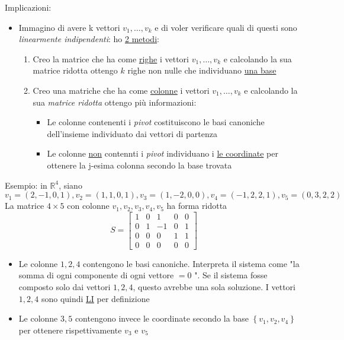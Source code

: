 \documentclass[12pt,a4paper,oneside]{article}
\begin{document}
Implicazioni:
\begin{itemize}
	\item Immagino di avere k vettori $v_1,\ldots,v_k$ e di voler verificare quali di questi sono \textit{linearmente indipendenti}: ho \underline{2 metodi}:
	      \begin{enumerate}
		      \item Creo la matrice che ha come \underline{righe} i vettori $v_1,\ldots,v_k$ e calcolando la sua matrice ridotta ottengo $k$ righe non nulle che individuano \underline{una base}
		      \item Creo una matriche che ha come \underline{colonne} i vettori $v_1,\ldots,v_k$ e calcolando la sua \textit{matrice ridotta} ottengo più informazioni:
		            \begin{itemize}
			            \item Le colonne contenenti i \textit{pivot} costituiscono le basi canoniche dell'insieme individuato dai vettori di partenza
			            \item Le colonne \underline{non} contennti i \textit{pivot} individuano i \underline{le coordinate} per ottenere la j-esima colonna secondo la base trovata
		            \end{itemize}
	      \end{enumerate}
\end{itemize}
Esempio: in $\mathbb{R}^4$, siano
$$
	v_1=(2,-1,0,1), v_2=(1,1,0,1), v_3=(1,-2,0,0), v_4=(-1,2,2,1), v_5=(0,3,2,2)
$$
La matrice $4 \times 5$ con colonne $v_1, v_2, v_3, v_4, v_5$ ha forma ridotta
$$
	S=\left[\begin{array}{rrrrr}
			1 & 0 & 1  & 0 & 0 \\
			0 & 1 & -1 & 0 & 1 \\
			0 & 0 & 0  & 1 & 1 \\
			0 & 0 & 0  & 0 & 0
		\end{array}\right]
$$
\begin{itemize}
	\item Le colonne $1,2,4$ contengono le basi canoniche. Interpreta il sistema come "la somma di ogni componente di ogni vettore $=0$ ". Se il sistema fosse composto solo dai vettori $1,2,4$, questo avrebbe una sola soluzione. I vettori $1,2,4$ sono quindi \underline{LI} per definizione
	\item Le colonne $3,5$ contengono invece le coordinate secondo la base $\left\{ v_1,v_2,v_4 \right\} $ per ottenere rispettivamente $v_3$ e $v_5$
\end{itemize}
\end{document}
